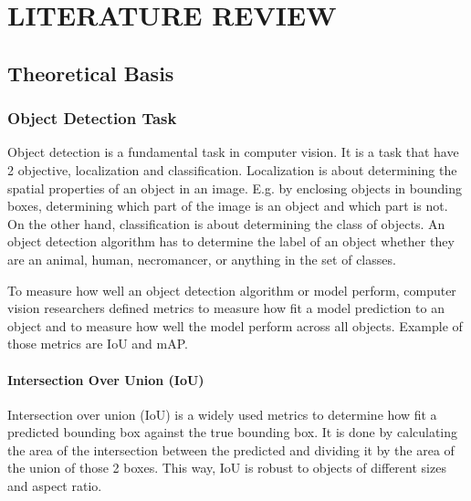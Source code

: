 \chapter{LITERATURE REVIEW}
\section{Theoretical Basis}
  \subsection{Object Detection Task}

  Object detection is a fundamental task in computer vision.
  It is a task that have 2 objective, localization and classification.
  Localization is about determining the spatial properties of an object in an image. E.g. by
  enclosing objects in bounding boxes, determining which part of the image is an object and which part is not. 
  On the other hand, classification is about determining the class of
  objects. An object detection algorithm has to determine the label of an object whether
  they are an animal, human, necromancer, or anything in the set of classes.

  To measure how well an object detection algorithm or model perform, computer vision
  researchers defined metrics to measure how fit a model prediction to an object
  and to measure how well the model perform across all objects. Example of those metrics are IoU and mAP.
  



  \subsubsection{Intersection Over Union (IoU)}


  Intersection over union (IoU) is a widely used metrics to determine how fit a predicted bounding box against the true bounding box.
  It is done by calculating the area of the intersection between the predicted and dividing it by the area of the
  union of those 2 boxes. 
  This way, IoU is robust to objects of different sizes and aspect ratio. 

